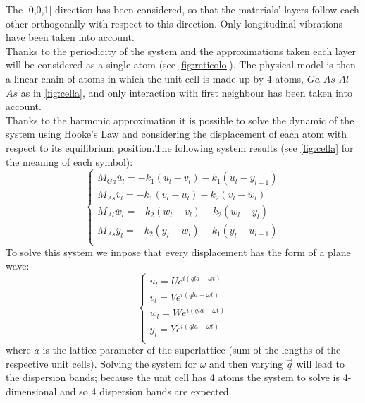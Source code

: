 \documentclass{article}
\begin{document}
The [0,0,1] direction has been considered, so that the materials' layers follow each other orthogonally with respect to this direction. Only longitudinal vibrations have been taken into account. \\
Thanks to the periodicity of the system and the approximations taken each layer will be considered as a single atom (see \autoref{fig:reticolo}). The physical model is then a linear chain of atoms in which the unit cell is made up by 4 atoms, $Ga$-$As$-$Al$-$As$ as in \autoref{fig:cella}, and only interaction with first neighbour has been taken into account. \\
Thanks to the harmonic approximation it is possible to solve the dynamic of the system using Hooke's Law and considering the displacement of each atom with respect to its equilibrium position.The following system results (see \autoref{fig:cella} for the meaning of each symbol):
\begin{equation}
	\begin{cases}
	M_{Ga}\ddot{u_l} = -k_1(u_l-v_l) - k_1(u_l-y_{l-1}) \\
	M_{As}\ddot{v_l} = -k_1(v_l-u_l) - k_2(v_l-w_l) \\
	M_{Al}\ddot{w_l} = -k_2(w_l-v_l) - k_2(w_l-y_l) \\
	M_{As}\ddot{y_l} = -k_2(y_l-w_l) - k_1(y_l-u_{l+1}) \\
	\end{cases}
	\label{eq:sistema}	
\end{equation}
To solve this system we impose that every displacement has the form of a plane wave:
\begin{equation}
	\begin{cases}
	u_l = Ue^{i(qla-\omega t)} \\
	v_l = Ve^{i(qla-\omega t)} \\
	w_l = We^{i(qla-\omega t)} \\
	y_l = Ye^{i(qla-\omega t)} \\
	\end{cases}
	\label{eq:onde piane}
\end{equation}
where $a$ is the lattice parameter of the superlattice (sum of the lengths of the respective unit cells).
Solving the system for $\omega$ and then varying $\vec{q}$ will lead to the dispersion bands; because the unit cell has 4 atoms the system to solve is 4-dimensional and so 4 dispersion bands are expected.  
\end{document}
